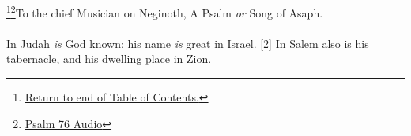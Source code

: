 \footnote{\textcolor[rgb]{0.00,0.25,0.00}{\hyperlink{TOC}{Return to end of Table of Contents.}}}\footnote{\href{https://audiobible.com/bible/psalms_76.html}{\textcolor[cmyk]{0.99998,1,0,0}{Psalm 76 Audio}}}\textcolor[cmyk]{0.99998,1,0,0}{To the chief Musician on Neginoth, A Psalm \emph{or} Song of Asaph.}\\
\\
\textcolor[cmyk]{0.99998,1,0,0}{In Judah \emph{is} God known: his name \emph{is} great in Israel.} %
[2] \textcolor[cmyk]{0.99998,1,0,0}{In Salem also is his tabernacle, and his dwelling place in Zion.} %
